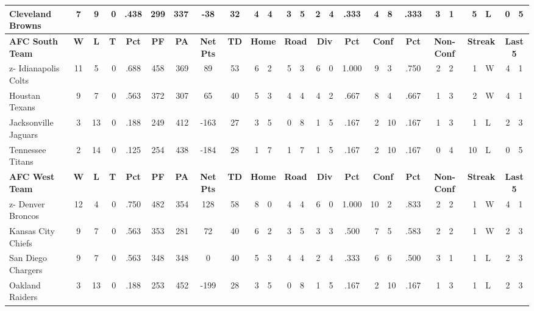 \documentclass{article}
\begin{document}
{\begin{tabular}{|l|c|c|r|c|c|r|c|c|r@{-}l|r@{-}l|r@{-}l|c|r@{-}l|c|r@{-}l|r@{}l|r@{-}l|}
	\hline
	Cleveland Browns & 7 & 9 & 0 & .438 & 299 & 337 & -38 & 32 & 4 & 4 & 3 & 5 & 2 & 4 & .333 & 4 & 8 & .333 & 3 & 1 & 5 & L & 0 & 5 \\
	\hline
	\hline
	\bfseries AFC South Team & \bfseries W & \bfseries L & \bfseries T & \bfseries Pct & \bfseries PF & \bfseries PA & 
	\bfseries Net Pts & \bfseries TD & \multicolumn{2}{|c|}{\bfseries Home} & \multicolumn{2}{|c|}{\bfseries Road} & 
	\multicolumn{2}{|c|}{\bfseries Div}  & \bfseries Pct & \multicolumn{2}{|c|}{\bfseries Conf} & \bfseries Pct  & 
	\multicolumn{2}{|c|}{\bfseries Non-Conf}
	& \multicolumn{2}{|c|}{\bfseries Streak} &
	\multicolumn{2}{|c|}{\bfseries Last 5} \\
	\hline
	\hline
	z- Idianapolis Colts & 11 & 5 & 0 & .688 & 458 & 369 & 89 & 53 & 6 & 2 & 5 & 3 & 6 & 0 & 1.000 & 9 & 3 &  .750 & 2 & 2 & 1 & W & 4 & 1 \\
	\hline
	Houstan Texans & 9 & 7 & 0 & .563 & 372 & 307 & 65 & 40 & 5 & 3 & 4 & 4 & 4 & 2 & .667 & 8 & 4 & .667 & 1 & 3 & 2 & W & 4 & 1 \\
	\hline
	Jacksonville Jaguars & 3 & 13 & 0 & .188 & 249 & 412 & -163 & 27 & 3 & 5 & 0 & 8 & 1 & 5 & .167 & 2 & 10 & .167 & 1 & 3 & 1 & L & 2 & 3 \\
	\hline
	Tennessee Titans & 2 & 14 & 0 & .125 & 254 & 438 & -184 & 28 & 1 & 7 & 1 & 7 & 1 & 5 & .167 & 2 & 10 & .167 & 0 & 4 & 10 & L & 0 & 5 \\
	\hline
	\hline
	\bfseries AFC West Team & \bfseries W & \bfseries L & \bfseries T & \bfseries Pct & \bfseries PF & \bfseries PA & 
	\bfseries Net Pts & \bfseries TD & \multicolumn{2}{|c|}{\bfseries Home} & \multicolumn{2}{|c|}{\bfseries Road} & 
	\multicolumn{2}{|c|}{\bfseries Div}  & \bfseries Pct & \multicolumn{2}{|c|}{\bfseries Conf} & \bfseries Pct  & 
	\multicolumn{2}{|c|}{\bfseries Non-Conf}
	& \multicolumn{2}{|c|}{\bfseries Streak} &
	\multicolumn{2}{|c|}{\bfseries Last 5} \\
	\hline
	\hline
	z- Denver Broncos & 12 & 4 & 0 & .750 & 482 & 354 & 128 & 58 & 8 & 0 & 4 & 4 & 6 & 0 & 1.000 & 10 & 2 & .833 & 2 & 2 & 1 & W & 4 & 1 \\
	\hline
	Kansas City Chiefs & 9 & 7 & 0 & .563 & 353 & 281 & 72 & 40 & 6 & 2 & 3 & 5 & 3 & 3 & .500 & 7 & 5 & .583 & 2 & 2 & 1 & W & 2 & 3 \\
	\hline
	San Diego Chargers & 9  & 7 & 0 & .563 & 348 & 348 & 0 & 40 & 5 & 3 & 4 & 4 & 2 & 4 & .333 & 6 & 6 & .500 & 3 & 1 & 1 & L & 2 & 3 \\
	\hline
	Oakland Raiders & 3 & 13 & 0 & .188 & 253 & 452 & -199 & 28 & 3 & 5 & 0 & 8 & 1 & 5 & .167 & 2 & 10 & .167 & 1 & 3 & 1 & L & 2 & 3 \\ 

\end{tabular}}
\end{document}
